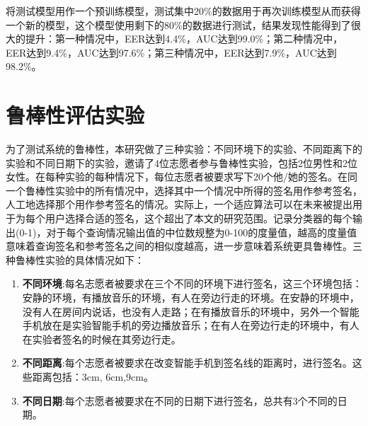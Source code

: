 将测试模型用作一个预训练模型，测试集中20\%的数据用于再次训练模型从而获得一个新的模型，这个模型使用剩下的80\%的数据进行测试，结果发现性能得到了很大的提升：第一种情况中，EER达到4.4\%，AUC达到99.0\%；第二种情况中，EER达到9.4\%，AUC达到97.6\%；第三种情况中，EER达到7.9\%，AUC达到98.2\%。

\section{鲁棒性评估实验}
\label{sec:robustness-experiment}
为了测试系统的鲁棒性，本研究做了三种实验：不同环境下的实验、不同距离下的实验和不同日期下的实验，邀请了4位志愿者参与鲁棒性实验，包括2位男性和2位女性。在每种实验的每种情况下，每位志愿者被要求写下20个他/她的签名。在同一个鲁棒性实验中的所有情况中，选择其中一个情况中所得的签名用作参考签名，人工地选择那个用作参考签名的情况。实际上，一个适应算法可以在未来被提出用于为每个用户选择合适的签名，这个超出了本文的研究范围。记录分类器的每个输出(0-1)，对于每个查询情况输出值的中位数规整为0-100的度量值，越高的度量值意味着查询签名和参考签名之间的相似度越高，进一步意味着系统更具鲁棒性。三种鲁棒性实验的具体情况如下：

\begin{enumerate}[label=(\arabic*)]
    \item \textbf{不同环境}:每名志愿者被要求在三个不同的环境下进行签名，这三个环境包括：安静的环境，有播放音乐的环境，有人在旁边行走的环境。在安静的环境中，没有人在房间内说话，也没有人走路；在有播放音乐的环境中，另外一个智能手机放在是实验智能手机的旁边播放音乐；在有人在旁边行走的环境中，有人在实验者签名的时候在其旁边行走。
    \item \textbf{不同距离}:每个志愿者被要求在改变智能手机到签名线的距离时，进行签名。这些距离包括：3cm, 6cm,9cm。
    \item \textbf{不同日期}:每个志愿者被要求在不同的日期下进行签名，总共有3个不同的日期。
\end{enumerate}

